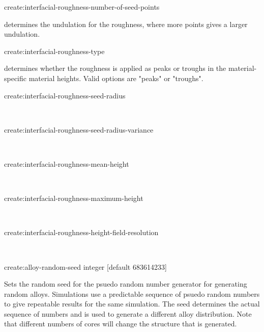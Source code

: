 {\zicf create:interfacial-roughness-number-of-seed-points} determines the undulation for the roughness, where more points gives a larger undulation.\\ \par

{\zicf create:interfacial-roughness-type} determines whether the roughness is applied as peaks or troughs in the material-specific material heights. Valid options are "peaks" or "troughs".\\ \par

{\zicf create:interfacial-roughness-seed-radius}\\ \par

{\zicf create:interfacial-roughness-seed-radius-variance}\\ \par

{\zicf create:interfacial-roughness-mean-height}\\ \par

{\zicf create:interfacial-roughness-maximum-height}\\ \par

{\zicf create:interfacial-roughness-height-field-resolution}\\ \par

{\zicf create:alloy-random-seed integer [default 683614233]}
Sets the random seed for the psuedo random number generator for generating random
alloys. Simulations use a predictable sequence of psuedo random numbers to give
repeatable results for the same simulation. The seed determines the actual
sequence of numbers and is used to generate a different alloy distribution.
Note that different numbers of cores will change the structure that is generated.\\

